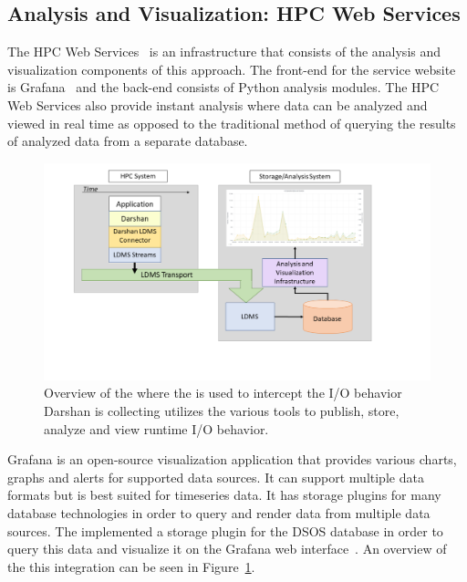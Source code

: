 \subsection{Analysis and Visualization: HPC Web Services}
The HPC Web Services~\cite{ClusterAV} is an infrastructure that consists of the analysis and visualization components of this approach. 
The front-end for the service website is Grafana~\cite{grafana-website} and the back-end consists of Python analysis modules. The HPC Web Services also provide instant analysis where data can be analyzed and viewed in real time as opposed to the traditional method of querying the results of analyzed data from a separate database.

\begin{figure}
	\centering
	\includegraphics[trim=3cm 2cm 0cm 0cm, clip,width=1.2\linewidth]{figs/darshan-integration.pdf}
	\caption{Overview of the \Darshan{} where the \connector{} is used to intercept the I/O behavior Darshan is collecting utilizes the various tools to publish, store, analyze and view runtime I/O behavior.}
	\label{f:FrameworkOverview}
\end{figure}

Grafana is an open-source visualization application that provides various charts, graphs and alerts for supported data sources. It can support multiple data formats but is best suited for timeseries data. It has storage plugins for many database technologies in order to query and render data from multiple data sources. The \Darshan{} implemented a storage plugin for the DSOS database in order to query this data and visualize it on the Grafana web interface~\cite{grafana-website}. An overview of the this integration can be seen in Figure~\ref{f:FrameworkOverview}.

